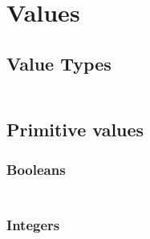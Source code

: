 \section{Values}\hypertarget{values}{}\label{values}

\subsection{Value Types}\hypertarget{value-types}{}\label{value-types}

\begin{align*}
  [ \
  \KEY{Type} \quad & \NAMEHYPER{../../../../../Funcons-beta/Values}{Value-Types}{value-types} \\
  \KEY{Alias} \quad & \NAMEHYPER{../../../../../Funcons-beta/Values}{Value-Types}{types}
  \ ]
\end{align*}
\subsection{Primitive values}\hypertarget{primitive-values}{}\label{primitive-values}

\subsubsection{Booleans}\hypertarget{booleans}{}\label{booleans}

\begin{align*}
  [ \
  \KEY{Datatype} \quad & \NAMEHYPER{../../../../../Funcons-beta/Values/Primitive}{Booleans}{booleans} \\
  \KEY{Alias} \quad & \NAMEHYPER{../../../../../Funcons-beta/Values/Primitive}{Booleans}{bools} \\
  \KEY{Funcon} \quad & \NAMEHYPER{../../../../../Funcons-beta/Values/Primitive}{Booleans}{true} \\
  \KEY{Funcon} \quad & \NAMEHYPER{../../../../../Funcons-beta/Values/Primitive}{Booleans}{false} \\
  \KEY{Funcon} \quad & \NAMEHYPER{../../../../../Funcons-beta/Values/Primitive}{Booleans}{not}
  \ ]
\end{align*}
\subsubsection{Integers}\hypertarget{integers}{}\label{integers}


